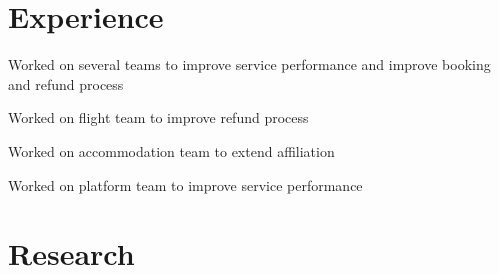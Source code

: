 \documentclass[a4paper]{deedy-resume} %
\begin{document}
\begin{minipage}[t]{0.66\textwidth} %


\section{Experience}


\vspace{\topsep} %
\begin{tightitemize}
\item Worked on several teams to improve service performance and improve booking and refund process
\item Worked on flight team to improve refund process
\item Worked on accommodation team to extend affiliation
\end{tightitemize}

\sectionspace %



\begin{tightitemize}
\item Worked on platform team to improve service performance
\end{tightitemize}

\sectionspace %


\section{Research}




\end{minipage}
\end{document}
